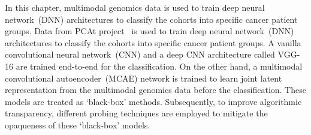 
\hspace*{3.5mm} In this chapter, multimodal genomics data is used to train deep neural network~(DNN) architectures to classify the cohorts into specific cancer patient groups. Data from PCAt project~\cite{weinstein2013cancer} is used to train deep neural network~(DNN) architectures to classify the cohorts into specific cancer patient groups. A vanilla convolutional neural network~(CNN) and a deep CNN architecture called VGG-16 are trained end-to-end for the classification. On the other hand, a multimodal convolutional autoencoder~(MCAE) network is trained to learn joint latent representation from the multimodal genomics data before the classification. These models are treated as `black-box' methods. Subsequently, to improve algorithmic transparency, different probing techniques are employed to mitigate the opaqueness of these `black-box' models. 


